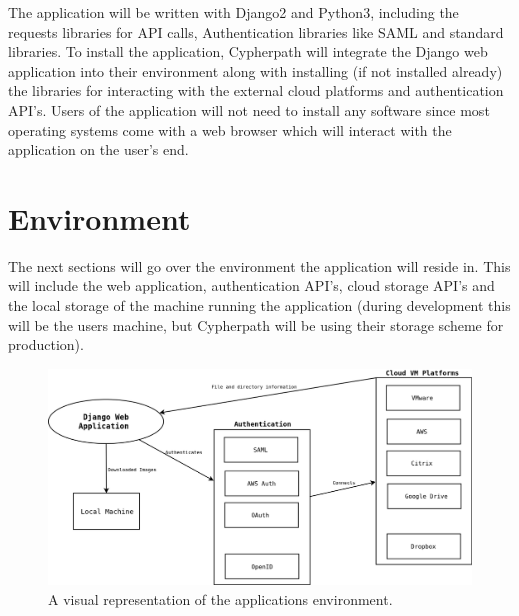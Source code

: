 \documentclass{article}
\begin{document}
    The application will be written with Django2 and Python3, including the requests libraries for API calls, Authentication libraries like SAML
    and standard libraries. To install the application, Cypherpath will integrate the Django web application into their environment along with installing (if not installed already)
    the libraries for interacting with the external cloud platforms and authentication API's. Users of the application will not need to install any software since most operating systems come
    with a web browser which will interact with the application on the user's end.


	
    \section{Environment}
    The next sections will go over the environment the application will reside in. This will include the web application, authentication API's, cloud storage API's and the local storage
    of the machine running the application (during development this will be the users machine, but Cypherpath will be using their storage scheme for production).
	
    \begin{figure}[h]
    \includegraphics[scale=.4]{downloader_env}
        \caption{A visual representation of the applications environment.}
    \end{figure}
\end{document}
